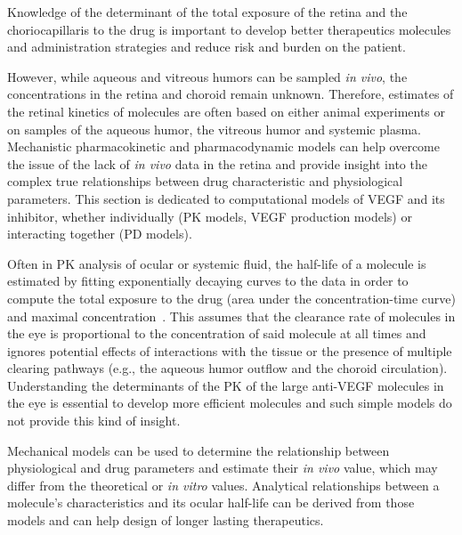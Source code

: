 \documentclass[12pt,a4paper]{journal}
\begin{document}
Knowledge of the determinant of the total exposure of the retina and the choriocapillaris to the drug is important to develop better therapeutics molecules and administration strategies and reduce risk and burden on the patient.

However, while aqueous and vitreous humors can be sampled \textit{in vivo}, the concentrations in the retina and choroid remain unknown. 
Therefore, estimates of the retinal kinetics of molecules are often based on either animal experiments or on samples of the aqueous humor, the vitreous humor and systemic plasma.
Mechanistic pharmacokinetic and pharmacodynamic models can help overcome the issue of the lack of \textit{in vivo} data in the retina and provide insight into the complex true relationships between drug characteristic and physiological parameters.
This section is dedicated to computational models of VEGF and its inhibitor, whether individually (PK models, VEGF production models) or interacting together (PD models).


Often in PK analysis of ocular or systemic fluid, the half-life of a molecule is estimated by fitting exponentially decaying curves to the data in order to compute the total exposure to the drug (area under the concentration-time curve) and maximal concentration~\cite{Bakri_2007, Kaiser_2019, Park_2015, Park_2016, Xu_2013}.
This assumes that the clearance rate of molecules in the eye is proportional to the concentration of said molecule at all times and ignores potential effects of interactions with the tissue or the presence of multiple clearing pathways (e.g., the aqueous humor outflow and the choroid circulation).
Understanding the determinants of the PK of the large anti-VEGF molecules in the eye is essential to develop more efficient molecules and such simple models do not provide this kind of insight.

Mechanical models can be used to determine the relationship between physiological and drug parameters and estimate their \textit{in vivo} value, which may differ from the theoretical or \textit{in vitro} values.
Analytical relationships between a molecule's characteristics and its ocular half-life can be derived from those models and can help design of longer lasting therapeutics.
\end{document}
